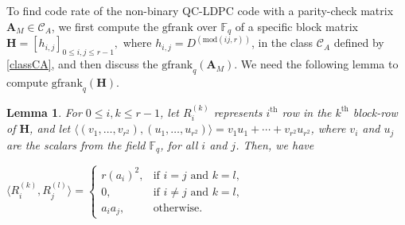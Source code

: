 \documentclass[conference]{IEEEtran}
\newtheorem{lemma}{Lemma}
\begin{document}
To find code rate of the non-binary QC-LDPC code with a parity-check matrix {\small$\mathbf{A}_{M} \in \mathcal{C}_{A}$}, we first compute the $\mathrm{gfrank}$ over $\mathbb{F}_{q}$ of a specific block matrix ~{\small$\mathbf{H} =
   [h_{i,j}]_{0 \leq i,j \leq r-1},$} where {\small$h_{i,j} = D^{(\mathrm{mod}(ij, r))}$}, in the class $\mathcal{C}_{A}$ defined by \eqref{classCA}, and
 then discuss the {\small$\mathrm{gfrank}_{q}(\mathbf{A}_{M})$}. We need the following lemma to compute $\mathrm{gfrank}_{q}(\mathbf{H})$.
\begin{lemma}\label{lemma1}For $0\leq i,k\leq r-1$, let $R_{i}^{(k)}$ represents $i^{\text{th}}$ row in the $k^{\text{th}}$ block-row of $\mathbf{H}$, and let $\langle(v_{1},\ldots,v_{r^{2}}),(u_{1},\ldots,u_{r^{2}})\rangle=v_{1}u_{1}+\cdots+v_{r^{2}}u_{r^{2}}$, where $v_{i}$ and $u_{j}$ are the scalars from the field $\mathbb{F}_{q}$, for all $i$ and $j$. Then, we have
	\begin{center}
		$\langle R_{i}^{(k)},R_{j}^{(l)}\rangle=\begin{cases}
			r(a_{i})^{2},&\text{if } i=j\text{ and }k=l,\\
			0,&\text{if } i\neq j\text{ and }k=l,\\
			a_{i}a_{j},&\text{otherwise}.
		\end{cases}$
	\end{center}
\end{lemma}
\end{document}
